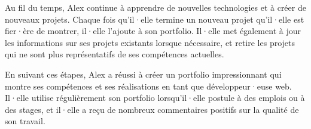 Au fil du temps, Alex continue à apprendre de nouvelles technologies et à créer de nouveaux projets. Chaque fois qu'il·elle termine un nouveau projet qu'il·elle est fier·ère de montrer, il·elle l'ajoute à son portfolio. Il·elle met également à jour les informations sur ses projets existants lorsque nécessaire, et retire les projets qui ne sont plus représentatifs de ses compétences actuelles.

En suivant ces étapes, Alex a réussi à créer un portfolio impressionnant qui montre ses compétences et ses réalisations en tant que développeur·euse web. Il·elle utilise régulièrement son portfolio lorsqu'il·elle postule à des emplois ou à des stages, et il·elle a reçu de nombreux commentaires positifs sur la qualité de son travail.


